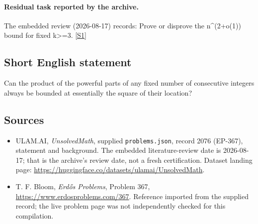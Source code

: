 \documentclass[11pt,a4paper]{article}
\newcommand{\sref}[2]{\hyperlink{source:#1:#2}{[S#2]}}
\begin{document}
\paragraph{Residual task reported by the archive.}

The embedded review (2026-08-17) records: Prove or disprove the n\textasciicircum{}(2+o(1)) bound for fixed k>=3. \sref{2076}{1}

\subsection{Short English statement}

Can the product of the powerful parts of any fixed number of consecutive integers always be bounded at essentially the square of their location?

\subsection{Sources}

{\small

\begin{itemize}

\item[\hypertarget{source:2076:1}{S1}] ULAM.AI, \emph{UnsolvedMath}, supplied \texttt{problems.json}, record 2076 (EP-367), statement and background. The embedded literature-review date is 2026-08-17; that is the archive’s review date, not a fresh certification. Dataset landing page: \url{https://huggingface.co/datasets/ulamai/UnsolvedMath}.

\item[\hypertarget{source:2076:2}{S2}] T. F. Bloom, \emph{Erdős Problems}, Problem 367, \url{https://www.erdosproblems.com/367}. Reference imported from the supplied record; the live problem page was not independently checked for this compilation.

\end{itemize}

}

\label{end:2076}
\end{document}

